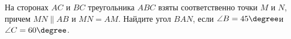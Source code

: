 \begin{ex}
	\begin{condition}
		На сторонах \( AC  \) и \( BC  \) треугольника \( ABC  \) взяты соответственно точки \( M  \) и \( N  \), причем \( MN \parallel AB  \) и \( MN = AM  \). Найдите угол \( BAN  \), если \( \angle B = 45\degree \)и \( \angle C = 60\degree \).
	\end{condition}
\end{ex}